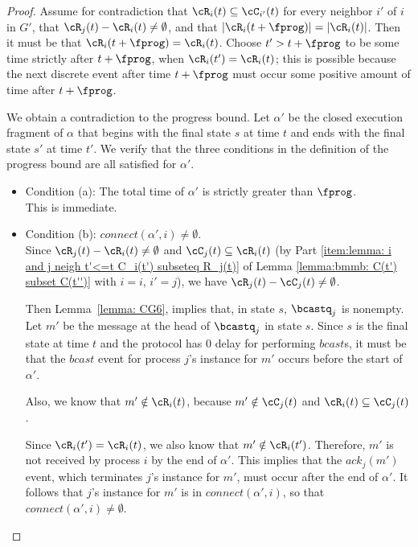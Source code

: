 \begin{proof}
Assume for contradiction that
$\cR_i(t) \subseteq \cC_{i'}(t)$ for every neighbor $i'$ of $i$ in $G'$,
that $\cR_j(t) - \cR_i(t) \neq \emptyset$, and
that $|\cR_i(t+\fprog)| = |\cR_i(t)|$.
Then it must be that $\cR_i(t+\fprog) = \cR_i(t)$.
Choose $t' > t + \fprog$ to be some time strictly after $t + \fprog$,
when $\cR_i(t') = \cR_i(t)$; this is possible because the next
discrete event after time $t + \fprog$ must occur some positive
amount of time after $t + \fprog$.



We obtain a contradiction to the progress bound.
Let $\alpha'$ be the closed execution fragment of $\alpha$ that begins
with the final state $s$ at time $t$ and ends with the final state
$s'$ at time $t'$.  We verify that the three conditions in the
definition of the progress bound are all satisfied for $\alpha'$.
\begin{itemize}
\item
Condition (a):  The total time of $\alpha'$ is strictly greater
than $\fprog$.  \\
This is immediate.

\item
Condition (b):  $connect(\alpha',i) \neq \emptyset$. \\
Since $\cR_j(t) - \cR_i(t) \neq \emptyset$ and $\cC_j(t) \subseteq \cR_i(t)$
(by Part
\ref{item:lemma: i and j neigh t'<=t C_i(t') subseteq R_j(t)}
of Lemma \ref{lemma:bmmb: C(t') subset C(t'')} with $i=i$, $i'=j$),
we have
$\cR_j(t) - \cC_j(t) \neq \emptyset$.


Then Lemma~\ref{lemma: CG6},
implies that, in state $s$,
$\bcastq_j$ is nonempty.
Let $m'$ be the message at the head of $\bcastq_j$ in state $s$.
Since $s$ is the final state at time $t$ and the protocol has $0$
delay for performing $bcast$s, it must be that the $bcast$ event for
process $j$'s instance for $m'$ occurs before the start of $\alpha'$.

Also, we know that $m' \notin \cR_i(t)$, because $m' \notin \cC_j(t)$ and
$\cR_i(t) \subseteq \cC_j(t)$.

Since $\cR_i(t') = \cR_i(t)$, we also know that $m' \notin \cR_i(t')$.
Therefore, $m'$ is not received by process $i$ by the end of
$\alpha'$.
This implies that the $ack_j(m')$ event, which terminates $j$'s
instance for $m'$, must occur after the end of $\alpha'$.
It follows that $j$'s instance for $m'$ is in $connect(\alpha', i)$,
so that $connect(\alpha',i) \neq \emptyset$.


\end{itemize}
\end{proof}
